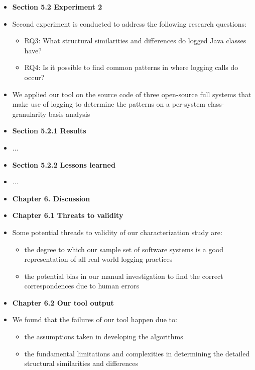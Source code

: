 \documentclass{article}
\newcommand{\bold}{\textbf}
\newcommand{\tsc}{\textsc}
\begin{document}
\begin{itemize} [leftmargin=.1in]
\item \bold{Section 5.2 Experiment 2}
\item Second experiment is conducted to address the following research questions:
\begin{itemize}
\item \tsc{RQ3: }What structural similarities and differences do logged Java classes have?
\item \tsc{RQ4: }Is it possible to find common patterns in where logging calls do occur?
\end{itemize}
\item We applied our tool on the source code of three open-source full systems that make use of logging to determine the patterns on a per-system class-granularity basis analysis
\item \bold{Section 5.2.1 Results}
\item ...
\item \bold{Section 5.2.2 Lessons learned}
\item ...

\item \bold{Chapter 6. Discussion}
\item \bold{Chapter 6.1 Threats to validity}
\item Some potential threads to validity of our characterization study are:
\begin{itemize}
\item the degree to which our sample set of software systems is a good representation of all real-world logging practices
\item the potential bias in our manual investigation to find the correct correspondences due to human errors
\end{itemize}
\item \bold{Chapter 6.2 Our tool output}
\item We found that the failures of our tool happen due to:
\begin{itemize}
\item the assumptions taken in developing the algorithms
\item the fundamental limitations and complexities in determining the detailed structural similarities and differences 
\end{itemize}


\end{itemize}
\end{document}
